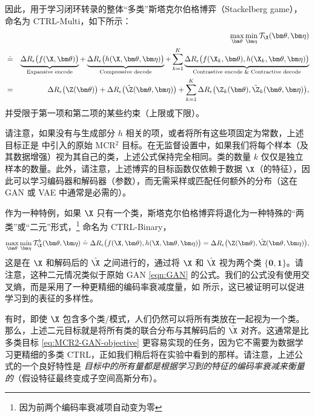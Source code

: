 \documentclass[../../book-main_zh.tex]{subfiles}
\begin{document}
因此，用于学习闭环转录的整体“多类”斯塔克尔伯格博弈（Stackelberg game），命名为 CTRL-Multi，如下所示：
\begin{eqnarray}
    &&\max_{\bm \theta} \min_{\bm \eta} \mathcal{T}_{\X}(\bm \theta,
    \bm \eta) \nonumber \\
    &\doteq& \underbrace{\Delta R_\epsilon\big(f(\X,\bm
    \theta)\big)}_{\text{Expansive encode}} + \underbrace{\Delta
        R_\epsilon\big(h(\X,\bm \theta, \bm
    \eta)\big)}_{\text{Compressive decode}} + \sum_{k=1}^K
    \underbrace{\Delta R_\epsilon\big(f(\X_k,\bm \theta), h(\X_k,\bm
    \theta,\bm \eta)\big)}_{\text{Contrastive encode \& Contractive
    decode}}  \nonumber \\
    &=& \Delta R_\epsilon\big(\Z(\bm \theta) \big) + \Delta
    R_\epsilon\big(\hat \Z(\bm \theta, \bm \eta)\big) + \sum_{k=1}^K
    \Delta R_\epsilon\big(\Z_k(
    \bm \theta), \hat \Z_k(\bm \theta, \bm \eta) \big),
    \label{eq:MCR2-GAN-objective}
\end{eqnarray}
并受限于第一项和第二项的某些约束（上限或下限）。

请注意，如果没有与生成部分 $h$ 相关的项，或者将所有这些项固定为常数，上述目标正是  中引入的原始 MCR$^2$ 目标。在无监督设置中，如果我们将每个样本（及其数据增强）视为其自己的类，上述公式保持完全相同。类的数量 $k$ 仅仅是独立样本的数量。此外，请注意，上述博弈的目标函数仅依赖于数据 $\X$（的特征），因此可以学习编码器和解码器（参数），而无需采样或匹配任何额外的分布（这在 GAN 或 VAE 中通常是必需的）。

作为一种特例，如果 $\X$ 只有一个类，斯塔克尔伯格博弈将退化为一种特殊的“两类”或“二元”形式，\footnote{因为前两个编码率衰减项自动变为零} 命名为 CTRL-Binary，
\begin{equation}
    \max_{\bm \theta} \min_{\bm \eta} \mathcal{T}^b_{\X}(\bm \theta,
    \bm \eta) \doteq \Delta R_\epsilon\big(f(\X,\bm \theta), h(\X,\bm
    \theta,\bm \eta)\big) = \Delta R_\epsilon\big(\Z(\bm \theta),
    \hat \Z(\bm \theta, \bm \eta)\big),
    \label{eq:MCR2-GAN-objective-binary}
\end{equation}
这是在 $\X$ 和解码后的 $\hat\X$ 之间进行的，通过将 $\X$ 和 $\hat \X$ 视为两个类 $\{\bm 0, \bm 1\}$。请注意，这种二元情况类似于原始 GAN \eqref{eqn:GAN} 的公式。我们的公式没有使用交叉熵，而是采用了一种更精细的编码率衰减度量，如  所示，这已被证明可以促进学习到的表征的多样性。 %

有时，即使 $\X$ 包含多个类/模式，人们仍然可以将所有类放在一起视为一个类。那么，上述二元目标就是将所有类的联合分布与其解码后的 $\hat \X$ 对齐。这通常是比多类目标 \eqref{eq:MCR2-GAN-objective} 更容易实现的任务，因为它不需要为数据学习更精细的多类 CTRL，正如我们稍后将在实验中看到的那样。请注意，上述公式的一个良好特性是 {\em 目标中的所有量都是根据学习到的特征的编码率衰减来衡量的}（假设特征最终变成子空间高斯分布）。
\end{document}
